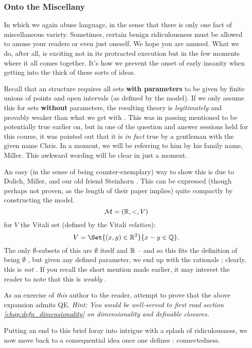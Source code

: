 \subsubsection{Onto the Miscellany}

In which we again abuse language, in the sense that there is only one fact of miscellaneous variety. Sometimes, certain benign ridiculousness must be allowed to amuse your readers or even just oneself. We hope you are amused. What we do, after all, is exciting not in its protracted execution but in the few moments where it all comes together. It's how we prevent the onset of early insanity when getting into the thick of these sorts of ideas.

\begin{remark}
  Recall that an \om structure requires all  sets \textbf{with parameters} to be given by finite unions of points and open intervals (as defined by the model). If we only assume this for sets  \textbf{without} parameters, the resulting theory is \emph{legitimately} and provably weaker than what we get with \omy. This was in passing mentioned to be potentially true earlier on, but in one of the question and answer sessions held for this course, it was pointed out that it is \emph{in fact} true by a gentleman with the given name Chris. In a moment, we will be referring to him by his family name, Miller. This awkward wording will be clear in just a moment.

  An easy (in the sense of being counter-exemplary) way to show this is due to Dolich, Miller, and our old friend Steinhorn \cite{dolich_structures_2009}. This can be expressed (though perhaps not proven, as the length of their paper implies) quite compactly by constructing the model.
  $$
    \mathcal{M} = (\mathbb{R}, <, V)
  $$
  for $V$ the Vitali set (defined by the Vitali \emph{relation}):
  $$
    V = \Set{(x, y) \in \R^2}{x - y \in \Q}.
  $$
  The only $\emptyset$- subsets of this are $\emptyset$ itself and $\mathbb{R}$ -- and so this fits the definition of being $\emptyset$ \om, but given any defined parameter, we end up with the rationals ; clearly, this is \emph{not} \om. If you recall the short mention made earlier, it may interest the reader to note that this is \emph{weakly} \om.

  \begin{exercise}
    As an exercise of \emph{this} author to the reader, attempt to prove that the above expansion admits QE. \textit{Hint: You would be well-served to first read section \ref{chap:defn_dimensionality} on dimensionality and definable closures.}
  \end{exercise}
\end{remark}

Putting an end to this brief foray into intrigue with a splash of ridiculousness, we now move back to a consequential idea once one defines \cds: connectedness.

